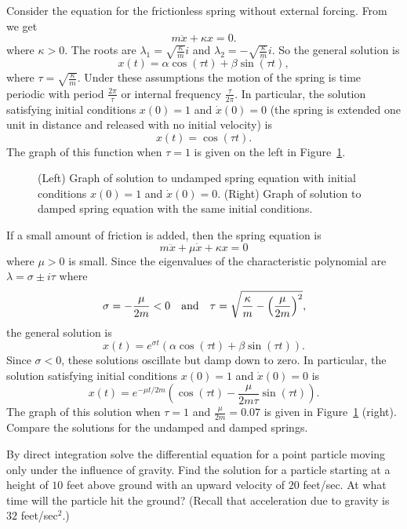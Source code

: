 Consider the equation for the frictionless spring without
external forcing.  From  we get  
\begin{equation} \label{ex:uspring}
m\ddot{x} + \kappa x = 0.
\end{equation}
where $\kappa>0$.  The roots are $\lambda_1=\sqrt{\frac{\kappa}{m}}i$
and $\lambda_2=-\sqrt{\frac{\kappa}{m}}i$.  So the general solution is
\[
x(t) = \alpha\cos(\tau t) + \beta\sin(\tau t),
\]
where $\tau=\sqrt{\frac{\kappa}{m}}$.  Under these assumptions the
motion of the spring is time periodic with period $\frac{2\pi}{\tau}$
or internal frequency $\frac{\tau}{2\pi}$.  In particular, the solution
satisfying initial conditions $x(0)=1$ and $\dot{x}(0)=0$ (the spring is
extended one unit in distance and released with no initial velocity) is
\[
x(t) = \cos(\tau t).
\]
The graph of this function when $\tau=1$ is given on the
left in Figure~\ref{F:springp}.
\begin{figure}[htb]
           \centerline{%
           }
           \caption{(Left) Graph of solution to undamped spring
	equation with initial conditions $x(0)=1$ and $\dot{x}(0)=0$.
	(Right) Graph of solution to damped spring equation with the
	same initial conditions.}
           \label{F:springp}
\end{figure}

If a small amount of friction is added, then the spring equation is
\[
m\ddot{x} + \mu \dot{x} +\kappa x = 0
\]
where $\mu>0$ is small.  Since the eigenvalues of the characteristic
polynomial are $\lambda=\sigma\pm i\tau$ where
\[
\sigma = -\frac{\mu}{2m} < 0 \quad\mbox{and}\quad \tau =\sqrt{\frac{\kappa}{m}
-\left(\frac{\mu}{2m}\right)^2},
\]
the general solution is
\[
x(t) = e^{\sigma t}(\alpha\cos(\tau t) + \beta\sin(\tau t)).
\]
Since $\sigma<0$, these solutions oscillate but damp down to zero.  In
particular, the solution satisfying initial conditions $x(0)=1$ and
$\dot{x}(0)=0$ is
\[
x(t) = e^{-\mu t/2m}
\left(\cos(\tau t)-\frac{\mu}{2m\tau}\sin(\tau t)\right).
\]
The graph of this solution when $\tau=1$ and $\frac{\mu}{2m}=0.07$ is
given in Figure~\ref{F:springp} (right).  Compare the solutions for the
undamped and damped springs.

\EXER

\TEXER

\begin{exercise} \label{c6.7.1}
By direct integration solve the differential equation 
for a point particle moving only under the influence of gravity.  Find the
solution for a particle starting at a height of $10$ feet above ground with
an upward velocity of $20$ feet/sec.  At what time will the particle hit
the ground?  (Recall that acceleration due to gravity is $32$ feet/sec$^2$.)
\end{exercise}

